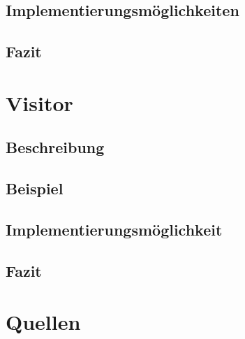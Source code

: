 \documentclass[a4paper,11pt]{scrartcl}
\begin{document}
\subsection{Implementierungsmöglichkeiten}

\subsection{Fazit}


\section{Visitor}

\subsection{Beschreibung}

\subsection{Beispiel}

\subsection{Implementierungsmöglichkeit}

\subsection{Fazit}


\section{Quellen}

\end{document}
